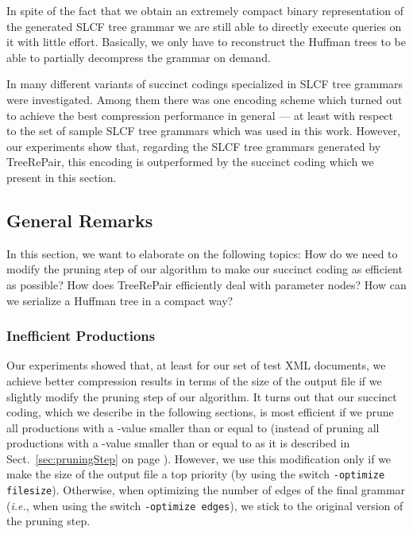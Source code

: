 \documentclass[12pt]{llncs}
\newcommand{\trp}{\mbox{TreeRePair}\xspace}
\newcommand{\hairsp}{\hspace{1pt}}\newcommand{\TODO}{\textcolor{red}{\bf TODO!}\xspace}
\newcommand{\ie}{\mbox{\textit{i.\hairsp{}e.}}\xspace}
\begin{document}
In spite of the fact that we obtain an extremely compact binary representation of the generated SLCF tree grammar we are still able to directly execute queries on it with little effort. Basically, we only have to reconstruct the Huffman trees to be able to partially decompress the grammar on demand.

In \cite{Maneth08xml} many different variants of succinct codings specialized in SLCF tree grammars were investigated. Among them there was one encoding scheme which turned out to achieve the best compression performance in general --- at least with respect to the set of sample SLCF tree grammars which was used in this work. However, our experiments show that, regarding the SLCF tree grammars generated by \trp, this encoding is outperformed by the succinct coding which we present in this section.

\subsection{General Remarks}\label{sec:succinctCodingGeneralRemarks}

In this section, we want to elaborate on the following topics: How do we need to modify the pruning step of our algorithm to make our succinct coding as efficient as possible? How does \trp efficiently deal with parameter nodes? How can we serialize a Huffman tree in a compact way?

\subsubsection{Inefficient Productions}

Our experiments showed that, at least for our set of test XML documents, we achieve better compression results in terms of the size of the output file if we slightly modify the pruning step of our algorithm. It turns out that our succinct coding, which we describe in the following sections, is most efficient if we prune all productions with a -value smaller than or equal to  (instead of pruning all productions with a -value smaller than or equal to  as it is described in Sect.~\ref{sec:pruningStep} on page \pageref{sec:pruningStep}). However, we use this modification only if we make the size of the output file a top priority (by using the switch \texttt{-optimize filesize}). Otherwise, when optimizing the number of edges of the final grammar (\ie, when using the switch \texttt{-optimize edges}), we stick to the original version of the pruning step.
\end{document}
